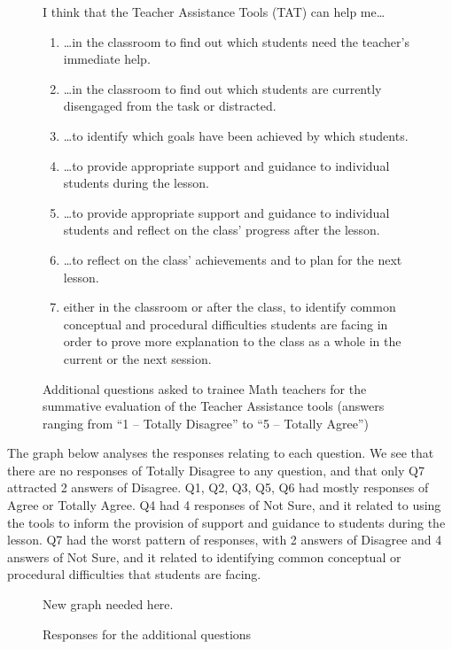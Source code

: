 \begin{figure}[htbp]
  I think that the Teacher Assistance Tools (TAT) can help me\ldots
  \begin{enumerate}
  \item \ldots in the
    classroom to find out which students need the teacher's immediate
    help.
  \item \ldots in the classroom to find out which students are
    currently disengaged from the task or distracted.
  \item \ldots to identify which goals have been achieved by which
    students.
  \item \ldots to provide appropriate support and guidance to individual
    students during the lesson.
  \item \ldots to provide appropriate support and guidance to individual
    students and reflect on the class' progress after the lesson.
  \item \ldots to reflect on the class' achievements and to plan for
    the next lesson.
  \item either in the classroom or after the class, to identify common
    conceptual and procedural difficulties students are facing in
    order to prove more explanation to the class as a whole in the
    current or the next session.
  \end{enumerate}
  \caption{Additional questions asked to trainee Math teachers for the
    summative evaluation of the Teacher Assistance tools (answers
    ranging from ``1 -- Totally Disagree'' to ``5 -- Totally Agree'')} 
  \label{fig:questions2-pgce}
\end{figure}


The graph below analyses the responses relating to each question. We
see that there are no responses of Totally Disagree to any question,
and that only Q7 attracted 2 answers of Disagree. Q1, Q2, Q3, Q5, Q6
had mostly responses of Agree or Totally Agree. Q4 had 4 responses of
Not Sure, and it related to using the tools to inform the provision of
support and guidance to students during the lesson. Q7 had the worst
pattern of responses, with 2 answers of Disagree and 4 answers of Not
Sure, and it related to identifying common conceptual or procedural
difficulties that students are facing.

\begin{figure}[htbp]
  \centering
  New graph needed here. 
  \caption{Responses for the additional questions} 
\label{fig:sjadsfnasdf}
\end{figure}




